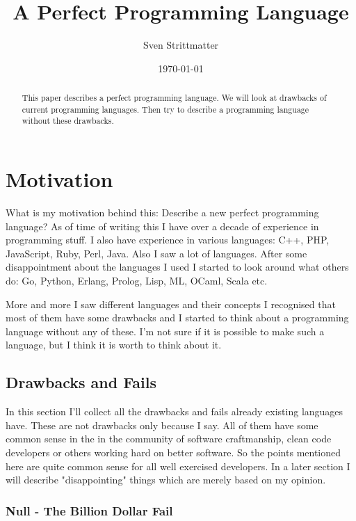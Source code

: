 \documentclass[a4paper,12pt]{report}
\title{A Perfect Programming Language}
\author{Sven Strittmatter}
\date{\today}
\begin{document}
\maketitle

\begin{abstract}
    This paper describes a perfect programming language. We will look at drawbacks of current programming languages. Then try to describe a programming language  without these drawbacks.
\end{abstract}
\clearpage

\tableofcontents
\clearpage

\chapter{Motivation}

What is my motivation behind this: Describe a new perfect programming language? As of time of writing this I have over a decade of experience in programming stuff. I also have experience in various languages: C++, PHP, JavaScript, Ruby, Perl, Java. Also I saw a lot of languages. After some disappointment about the languages I used I started to look around what others do: Go, Python, Erlang, Prolog, Lisp, ML, OCaml, Scala etc.

More and more I saw different languages and their concepts I recognised that most of them have some drawbacks and I started to think about a programming language without any of these. I'm not sure if it is possible to make such a language, but I think it is worth to think about it.

\section{Drawbacks and Fails}

In this section I'll collect all the drawbacks and fails already existing languages have. These are not drawbacks only because I say. All of them have some common sense in the in the community of software craftmanship, clean code developers or others working hard on better software. So the points mentioned here are quite common sense for all well exercised developers. In a later section I will describe "disappointing" things which are merely based on my opinion.

\subsection{Null - The Billion Dollar Fail}
\end{document}
